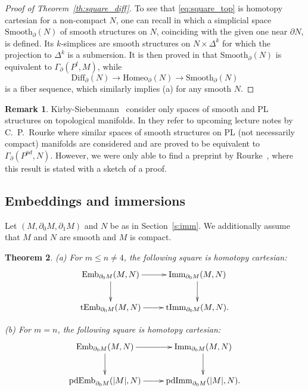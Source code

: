 \documentclass[11pt]{amsart}
\newtheorem{theorem}{Theorem}[section]
\theoremstyle{definition}
\newtheorem{remark}[theorem]{Remark}
\newcommand{\Emb}{\mathrm{Emb}}
\newcommand{\Imm}{\mathrm{Imm}}
\newcommand{\tImm}{\mathrm{tImm}}
\newcommand{\pdImm}{\mathrm{pdImm}}
\newcommand{\tEmb}{\mathrm{tEmb}}
\newcommand{\pdEmb}{\mathrm{pdEmb}}
\newcommand{\Diff}{\mathrm{Diff}}
\newcommand{\Homeo}{\mathrm{Homeo}}
\numberwithin{equation}{section}
\begin{document}
\begin{proof}[Proof of Theorem~\ref{th:square_diff}]
To see that \eqref{eq:square_top} is homotopy cartesian for a non-compact $N$, one can recall \cite[Essay~V]{KS_essays} in which  a simplicial space ${\mathrm{Smooth}}_\partial(N)$ of smooth structures
on $N$, coinciding with the given one near $\partial N$, is defined. Its $k$-simplices are smooth structures on $N\times\Delta^k$ for which the projection to $\Delta^k$ is a submersion. 
It is then proved in \cite[Theorem~2.2]{KS_essays} that $\mathrm{Smooth}_\partial(N)$ is equivalent to $\Gamma_\partial(P^t,M)$, while
\[
\Diff_\partial (N)\to \Homeo_\partial(N)\to \mathrm{Smooth}_\partial(N)
\]
is a fiber sequence, which similarly implies (a) for any smooth $N$.
\end{proof}

\begin{remark}\label{r:rourke}
Kirby-Siebenmann~\cite{KS_essays} consider only spaces of smooth and PL structures on topological manifolds. 
In \cite[Essay~5, $\S$0, p.~219]{KS_essays} they refer to upcoming lecture notes by C.~P.~Rourke where similar spaces of smooth structures on PL (not necessarily compact) manifolds are considered and are proved to be equivalent to~$\Gamma_\partial(P^{pd},N)$. However, we were only able to find a preprint by Rourke~\cite{Rourke}, where this result
 \cite[Theorem~1]{Rourke} is stated with  a sketch of  a proof.
\end{remark}

\subsection{Embeddings and immersions}\label{ss:square2}
Let $(M,\partial_0M,\partial_1M)$ and $N$ be as in Section~\ref{s:imm}. We additionally assume that $M$ and $N$ are smooth and $M$ is compact.


\begin{theorem}\label{th:square_emb}
(a) For $m\leq n\neq 4$,  the following square is homotopy cartesian:
\begin{equation}\label{eq:square_kupers}
\xymatrix{
\Emb_{\partial_0 M}(M,N)\ar[r]\ar[d]& \Imm_{\partial_0 M}(M,N)\ar[d]\\
\tEmb_{\partial_0 M}(M,N)\ar[r]& \tImm_{\partial_0 M}(M,N).
}
\end{equation}

(b) For $m=n$,  the following square is  homotopy cartesian:
\begin{equation}\label{eq:square_kupers3}
\xymatrix{
\Emb_{\partial_0 M}(M,N)\ar[r]\ar[d]& \Imm_{\partial_0 M}(M,N)\ar[d]\\
\pdEmb_{\partial_0 M}(|M|,N)\ar[r]& \pdImm_{\partial_0 M}(|M|,N).
}
\end{equation}
\end{theorem}
\end{document}
